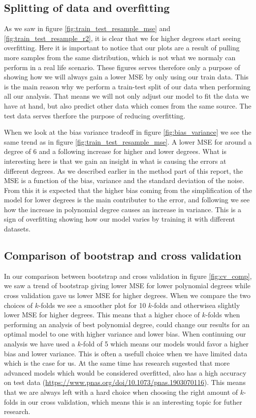 \documentclass[12pt]{article}
\begin{document}
\subsection{Splitting of data and overfitting}
As we saw in figure \ref{fig:train_test_resample_mse} and \ref{fig:train_test_resample_r2}, it is clear that we for higher degrees start seeing overfitting. Here it is important to notice that our plots are a result of pulling more samples from the same distribution, which is not what we normaly can perform in a real life scenario. These figures serves therefore only a purpose of showing how we will always gain a lower MSE by only using our train data. This is the main reason why we perform a train-test split of our data when performing all our analysis. That means we will not only adjust our model to fit the data we have at hand, but also predict other data which comes from the same source. The test data serves therfore the purpose of reducing overfitting.

When we look at the bias variance tradeoff in figure \ref{fig:bias_variance} we see the same trend as in figure \ref{fig:train_test_resample_mse}. A lower MSE for around a degree of 6 and a following increase for higher and lower degrees. What is interesting here is that we gain an insight in what is causing the errors at different degrees. As we described earlier in the method part of this report, the MSE is a function of the bias, variance and the standard deviation of the noise. From this it is expected that the higher bias coming from the simplification of the model for lower degrees is the main contributer to the error, and following we see how the increase in polynomial degree causes an increase in variance. This is a sign of overfitting showing how our model varies by training it with different datasets.

\subsection{Comparison of bootstrap and cross validation}
In our comparison between bootstrap and cross validation in figure \ref{fig:cv_comp}, we saw a trend of bootstrap giving lower MSE for lower polynomial degrees while cross validation gave us lower MSE for higher degrees. When we compare the two choices of $k$-folds we see a smoother plot for 10 $k$-folds and otherwisea slightly lower MSE for higher degrees. This means that a higher choce of $k$-folds when performing an analysis of best polynomial degree, could change our results for an optimal model to one with higher variance and lower bias. When continuing our analysis we have used a $k$-fold of 5 which means our models would favor a higher bias and lower variance. This is often a usefull choice when we have limited data which is the case for us. At the same time has research sugested that more advanced models which would be considered overfitted, also has a high accuracy on test data (\url{https://www.pnas.org/doi/10.1073/pnas.1903070116}). This means that we are always left with a hard choice when choosing the right amount of $k$-folds in our cross validation, which means this is an interesting topic for futher research.
\end{document}
